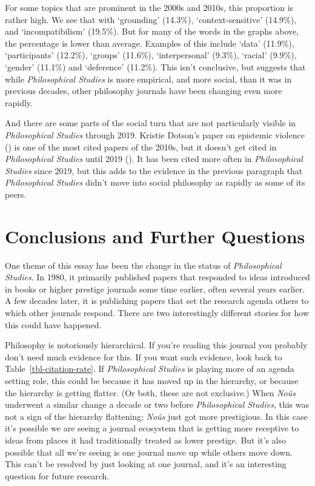 \documentclass[
  10pt,
  letterpaper,
  DIV=11,
  numbers=noendperiod,
  twoside]{scrartcl}
\begin{document}
For some topics that are prominent in the 2000s and 2010s, this
proportion is rather high. We see that with `grounding' (14.3\%),
`context-sensitive' (14.9\%), and `incompatibilism' (19.5\%). But for
many of the words in the graphs above, the percentage is lower than
average. Examples of this include `data' (11.9\%), `participants'
(12.2\%), `groups' (11.6\%), `interpersonal' (9.3\%), `racial' (9.9\%),
`gender' (11.1\%) and `deference' (11.2\%). This isn't conclusive, but
suggests that while \emph{Philosophical Studies} is more empirical, and
more social, than it was in previous decades, other philosophy journals
have been changing even more rapidly.

And there are some parts of the social turn that are not particularly
visible in \emph{Philosophical Studies} through 2019. Kristie Dotson's
paper on epistemic violence () is one of the most cited papers of the 2010s, but it doesn't get
cited in \emph{Philosophical Studies} until 2019
(). It has been cited
more often in \emph{Philosophical Studies} since 2019, but this adds to
the evidence in the previous paragraph that \emph{Philosophical Studies}
didn't move into social philosophy as rapidly as some of its peers.

\section{Conclusions and Further
Questions}\label{conclusions-and-further-questions}

One theme of this essay has been the change in the status of
\emph{Philosophical Studies}. In 1980, it primarily published papers
that responded to ideas introduced in books or higher prestige journals
some time earlier, often several years earlier. A few decades later, it
is publishing papers that set the research agenda others to which other
journals respond. There are two interestingly different stories for how
this could have happened.

Philosophy is notoriously hierarchical. If you're reading this journal
you probably don't need much evidence for this. If you want such
evidence, look back to Table~\ref{tbl-citation-rate}. If
\emph{Philosophical Studies} is playing more of an agenda setting role,
this could be because it has moved up in the hierarchy, or because the
hierarchy is getting flatter. (Or both, these are not exclusive.) When
\emph{Noûs} underwent a similar change a decade or two before
\emph{Philosophical Studies}, this was not a sign of the hierarchy
flattening; \emph{Noûs} just got more prestigious. In this case it's
possible we are seeing a journal ecosystem that is getting more
receptive to ideas from places it had traditionally treated as lower
prestige. But it's also possible that all we're seeing is one journal
move up while others move down. This can't be resolved by just looking
at one journal, and it's an interesting question for future research.
\end{document}
